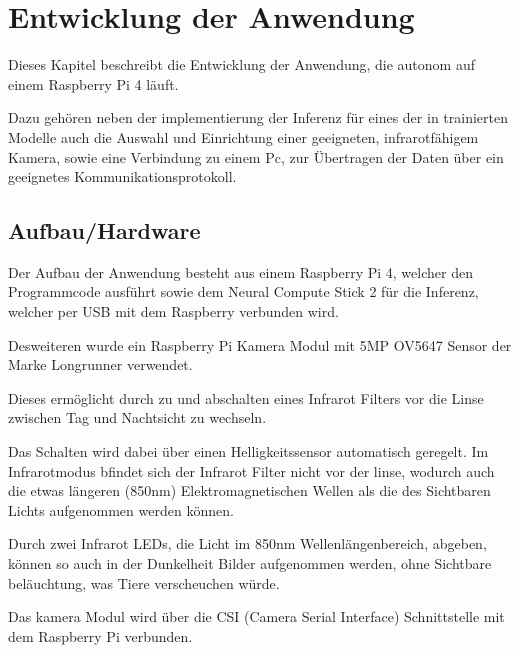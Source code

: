 
\chapter{Entwicklung der Anwendung}\label{kap:application}


Dieses Kapitel beschreibt die Entwicklung der Anwendung,
die autonom auf einem Raspberry Pi 4 läuft. 

Dazu gehören neben der implementierung der Inferenz 
für eines der in trainierten Modelle auch die Auswahl und 
Einrichtung einer geeigneten, infrarotfähigem Kamera, sowie 
eine Verbindung zu einem Pc, zur Übertragen der Daten 
über ein geeignetes Kommunikationsprotokoll.



\section{Aufbau/Hardware}\label{sec:aufbau}


Der Aufbau der Anwendung besteht aus einem Raspberry Pi 4, welcher
den Programmcode ausführt sowie dem Neural Compute Stick 2
für die Inferenz, welcher per USB mit dem Raspberry verbunden wird.

Desweiteren wurde ein Raspberry Pi Kamera Modul mit 
5MP OV5647 Sensor der Marke Longrunner verwendet.

Dieses ermöglicht durch zu und abschalten eines Infrarot 
Filters vor die Linse zwischen Tag und Nachtsicht zu wechseln.

Das Schalten wird dabei über einen Helligkeitssensor automatisch 
geregelt. Im Infrarotmodus bfindet sich der Infrarot Filter nicht 
vor der linse, wodurch auch die etwas längeren (850nm)
Elektromagnetischen Wellen als die des Sichtbaren Lichts aufgenommen 
werden können.

Durch zwei Infrarot LEDs, die Licht im 850nm Wellenlängenbereich, 
abgeben, können so auch in der Dunkelheit Bilder aufgenommen werden, ohne 
Sichtbare beläuchtung, was Tiere verscheuchen würde.

Das kamera Modul wird über die CSI (Camera Serial Interface) 
Schnittstelle mit dem Raspberry Pi verbunden.



